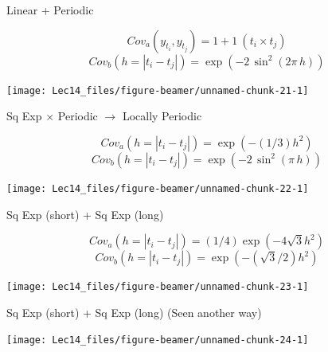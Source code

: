 \documentclass[11pt,ignorenonframetext,]{beamer}
\begin{document}
\begin{frame}[t]{Linear + Periodic}
\protect\hypertarget{linear-periodic}{}

\vspace{-5mm}

\[ Cov_a(y_{t_i}, y_{t_j}) = 1 + 1~(t_i \times t_j) \]
\[ Cov_b(h = |t_i - t_j|) = \exp\left(-2\, \sin^2\left(2\pi\,h\right)\right) \]

\begin{center}\texttt{[image: Lec14\_files/figure-beamer/unnamed-chunk-21-1]} \end{center}

\end{frame}

\begin{frame}[t]{Sq Exp \(\times\) Periodic \(\to\) Locally Periodic}
\protect\hypertarget{sq-exp-times-periodic-to-locally-periodic}{}

\vspace{-5mm}

\[ Cov_a(h = |t_i - t_j|) =\exp(-(1/3)h^2) \]
\[ Cov_b(h = |t_i - t_j|) = \exp\left(-2\, \sin^2\left(\pi\,h\right)\right) \]

\begin{center}\texttt{[image: Lec14\_files/figure-beamer/unnamed-chunk-22-1]} \end{center}

\end{frame}

\begin{frame}[t]{Sq Exp (short) + Sq Exp (long)}
\protect\hypertarget{sq-exp-short-sq-exp-long}{}

\vspace{-5mm}

\[ Cov_a(h = |t_i - t_j|) = (1/4) \exp(-4\sqrt{3}h^2) \]
\[ Cov_b(h = |t_i - t_j|) = \exp(-(\sqrt{3}/2)h^2) \]

\begin{center}\texttt{[image: Lec14\_files/figure-beamer/unnamed-chunk-23-1]} \end{center}

\end{frame}

\begin{frame}[t]{Sq Exp (short) + Sq Exp (long) (Seen another way)}
\protect\hypertarget{sq-exp-short-sq-exp-long-seen-another-way}{}

\begin{center}\texttt{[image: Lec14\_files/figure-beamer/unnamed-chunk-24-1]} \end{center}

\end{frame}
\end{document}
